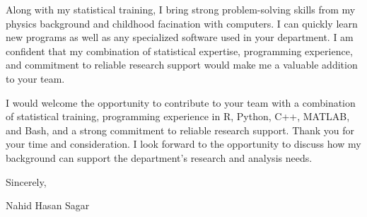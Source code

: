 \documentclass[10pt,letterpaper]{article}
\begin{document}
Along with my statistical training, I bring strong problem-solving skills from my physics background and childhood facination with computers. I can quickly learn new programs as well as any specialized software used in your department. I am confident that my combination of statistical expertise, programming experience, and commitment to reliable research support would make me a valuable addition to your team.

I would welcome the opportunity to contribute to your team with a combination of statistical training, programming experience in R, Python, C++, MATLAB, and Bash, and a strong commitment to reliable research support. Thank you for your time and consideration. I look forward to the opportunity to discuss how my background can support the department's research and analysis needs.

Sincerely,\\
\vspace{1em}

Nahid Hasan Sagar
\end{document}
